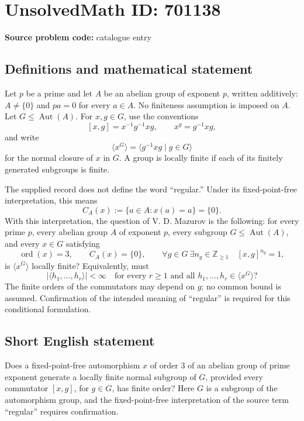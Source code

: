 \documentclass[11pt]{article}
\begin{document}
\section*{UnsolvedMath ID: 701138}
\textbf{Source problem code:} catalogue entry
\subsection{Definitions and mathematical statement}
Let \(p\) be a prime and let \(A\) be an abelian group of exponent \(p\), written additively: \(A\neq\{0\}\) and \(pa=0\) for every \(a\in A\). No finiteness assumption is imposed on \(A\). Let \(G\leq\operatorname{Aut}(A)\). For \(x,g\in G\), use the conventions
\[
[x,g]=x^{-1}g^{-1}xg,\qquad x^g=g^{-1}xg,
\]
and write
\[
\langle x^G\rangle=\bigl\langle g^{-1}xg\mid g\in G\bigr\rangle
\]
for the normal closure of \(x\) in \(G\). A group is locally finite if each of its finitely generated subgroups is finite.

The supplied record does not define the word ``regular.'' Under its fixed-point-free interpretation, this means
\[
C_A(x):=\{a\in A:x(a)=a\}=\{0\}.
\]
With this interpretation, the question of V. D. Mazurov is the following: for every prime \(p\), every abelian group \(A\) of exponent \(p\), every subgroup \(G\leq\operatorname{Aut}(A)\), and every \(x\in G\) satisfying
\[
\operatorname{ord}(x)=3,\qquad C_A(x)=\{0\},\qquad
\forall g\in G\ \exists n_g\in\mathbb Z_{\geq1}\quad [x,g]^{n_g}=1,
\]
is \(\langle x^G\rangle\) locally finite? Equivalently, must
\[
\left|\langle h_1,\ldots,h_r\rangle\right|<\infty
\quad\text{for every }r\geq1\text{ and all }h_1,\ldots,h_r\in\langle x^G\rangle?
\]
The finite orders of the commutators may depend on \(g\); no common bound is assumed. Confirmation of the intended meaning of ``regular'' is required for this conditional formulation.
\subsection{Short English statement}
Does a fixed-point-free automorphism \(x\) of order \(3\) of an abelian group of prime exponent generate a locally finite normal subgroup of \(G\), provided every commutator \([x,g]\), for \(g\in G\), has finite order? Here \(G\) is a subgroup of the automorphism group, and the fixed-point-free interpretation of the source term ``regular'' requires confirmation.
\end{document}
